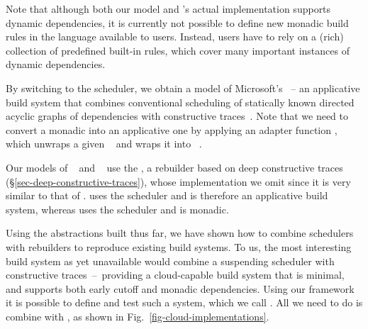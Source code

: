 Note that although both our model and \Bazel's actual implementation supports
dynamic dependencies, it is currently not possible to define new monadic build
rules in the language available to users. Instead, users have to rely on a
(rich) collection of predefined built-in rules, which cover many
important instances of dynamic dependencies.

By switching to the  scheduler, we obtain a model of
Microsoft's \CloudBuild~-- an applicative build system that combines
conventional scheduling of statically known directed acyclic graphs of
dependencies with constructive traces~\cite{esfahani2016cloudbuild}. Note that
we need to convert a monadic  into an applicative one by
applying an adapter function , which unwraps a given
~ and wraps it into ~.

Our models of \Buck~\cite{buck} and \Nix~\cite{dolstra2004nix} use the
, a rebuilder based on deep constructive traces
(\S\ref{sec-deep-constructive-traces}), whose implementation we omit since it
is very similar to that of . \Buck uses the 
scheduler and is therefore an applicative build system, whereas \Nix uses the
 scheduler and is monadic.

Using the abstractions built thus far, we have shown how to combine schedulers
with rebuilders to reproduce existing build systems. To us, the most interesting
build system as yet unavailable would combine a suspending scheduler with
constructive traces~--~providing a cloud-capable build system that is minimal,
and supports both early cutoff and monadic dependencies. Using our framework it
is possible to define and test such a system, which we call \Cloud \Shake. All
we need to do is combine  with ,
as shown in Fig.~\ref{fig-cloud-implementations}.
